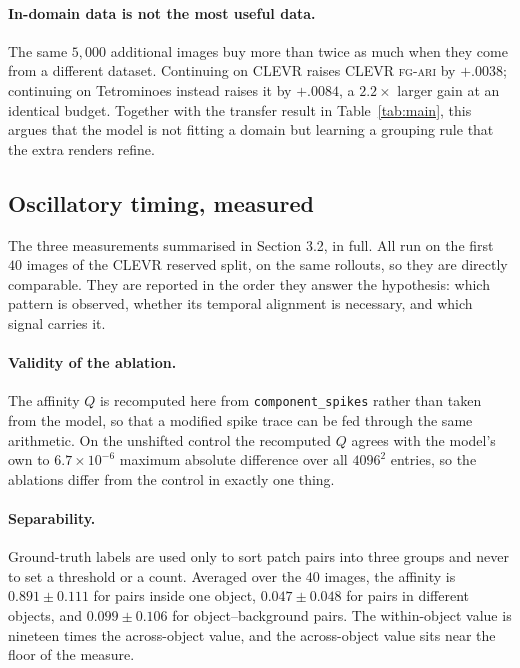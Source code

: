 \paragraph{In-domain data is not the most useful data.}
The same $5{,}000$ additional images buy more than twice as much when they come from a different
dataset. Continuing on CLEVR raises CLEVR \textsc{fg-ari} by $+.0038$; continuing on Tetrominoes
instead raises it by $+.0084$, a $2.2\times$ larger gain at an identical budget. Together with
the transfer result in Table~\ref{tab:main}, this argues that the model is not fitting a domain
but learning a grouping rule that the extra renders refine.

\subsection{Oscillatory timing, measured}
\label{sec:timing}

The three measurements summarised in Section 3.2, in full. All run on the first $40$ images of
the CLEVR reserved split, on the same rollouts, so they are directly comparable. They are
reported in the order they answer the hypothesis: which pattern is observed, whether its
temporal alignment is necessary, and which signal carries it.

\paragraph{Validity of the ablation.}
The affinity $Q$ is recomputed here from \texttt{component\_spikes} rather than taken from the
model, so that a modified spike trace can be fed through the same arithmetic. On the unshifted
control the recomputed $Q$ agrees with the model's own to $6.7\times10^{-6}$ maximum absolute
difference over all $4096^2$ entries, so the ablations differ from the control in exactly one
thing.

\paragraph{Separability.}
Ground-truth labels are used only to sort patch pairs into three groups and never to set a
threshold or a count. Averaged over the $40$ images, the affinity is $0.891\pm0.111$ for pairs
inside one object, $0.047\pm0.048$ for pairs in different objects, and $0.099\pm0.106$ for
object--background pairs. The within-object value is nineteen times the across-object value, and
the across-object value sits near the floor of the measure.

